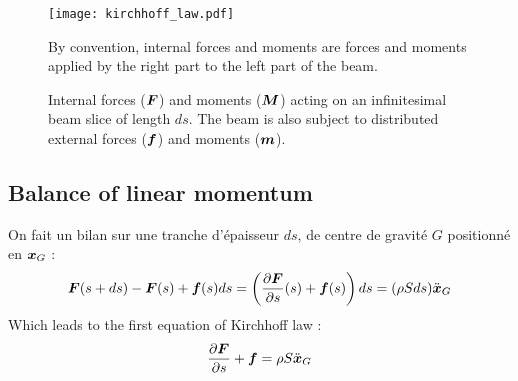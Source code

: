 \begin{figure}[t]
	\centering
	\texttt{[image: kirchhoff\_law.pdf]}
	\caption{Internal forces ($\boldsymbol{F}$) and moments ($\boldsymbol{M}$) acting on an infinitesimal beam slice of length $ds$. The beam is also subject to distributed external forces ($\boldsymbol{f}$) and moments ($\boldsymbol{m}$).} By convention, internal forces and moments are forces and moments applied by the right part to the left part of the beam.
	\label{fig:5_0}
\end{figure}

\subsection{Balance of linear momentum}
On fait un bilan sur une tranche d'épaisseur $ds$, de centre de gravité $G$ positionné en $\boldsymbol{x}_G$ :
\begin{equation}
	\boldsymbol{F}(s+ds)-\boldsymbol{F}(s) + \boldsymbol{f}(s)ds = \left(\frac{\partial \boldsymbol{F}}{\partial s}(s)+\boldsymbol{f}(s)\right)ds = (\rho Sds)\ddot{\boldsymbol{x}}_G
\end{equation}
Which leads to the first equation of Kirchhoff law :
\begin{equation}
	\frac{\partial \boldsymbol{F}}{\partial s}+\boldsymbol{f} = \rho S \ddot{\boldsymbol{x}}_G
\end{equation}

